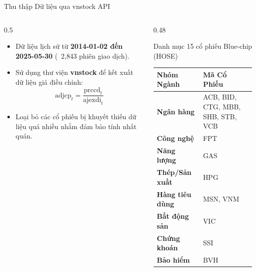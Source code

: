 \documentclass[10pt,aspectratio=169]{beamer}
\begin{document}
\begin{frame}{Thu thập Dữ liệu qua vnstock API}
  \begin{columns}
    \begin{column}{0.5\textwidth}
      \begin{itemize}
        \item Dữ liệu lịch sử từ \textbf{2014-01-02 đến 2025-05-30} (~2,843 phiên giao dịch).
        \item Sử dụng thư viện \textbf{vnstock} để kết xuất dữ liệu giá điều chỉnh:
        $$\text{adjcp}_t = \frac{\text{prccd}_t}{\text{ajexdi}_t}$$
        \item Loại bỏ các cổ phiếu bị khuyết thiếu dữ liệu quá nhiều nhằm đảm bảo tính nhất quán.
      \end{itemize}
    \end{column}
    
    \begin{column}{0.48\textwidth}
      \begin{block}{Danh mục 15 cổ phiếu Blue-chip (HOSE)}
        \centering
        \scriptsize
        \begin{tabular}{lp{3.5cm}}
          \toprule
          \textbf{Nhóm Ngành} & \textbf{Mã Cổ Phiếu} \\
          \midrule
          \textbf{Ngân hàng} & ACB, BID, CTG, MBB, SHB, STB, VCB \\
          \textbf{Công nghệ} & FPT \\
          \textbf{Năng lượng} & GAS \\
          \textbf{Thép/Sản xuất} & HPG \\
          \textbf{Hàng tiêu dùng} & MSN, VNM \\
          \textbf{Bất động sản} & VIC \\
          \textbf{Chứng khoán} & SSI \\
          \textbf{Bảo hiểm} & BVH \\
          \bottomrule
        \end{tabular}
      \end{block}
    \end{column}
  \end{columns}
\end{frame}
\end{document}
